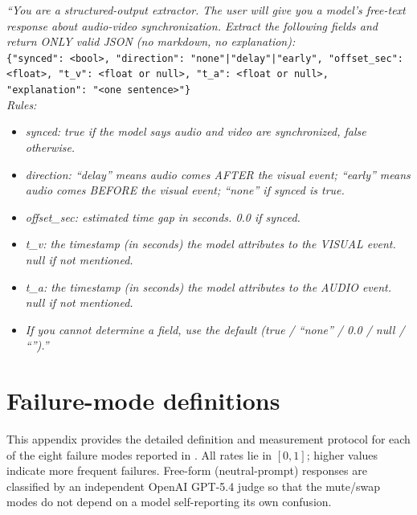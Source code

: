 \documentclass{llmxive}
\begin{document}
\begin{tcolorbox}[judgebox,title={\textsc{Shift} \textemdash{} Judge System Prompt}]
\textit{``You are a structured-output extractor. The user will give you a
model's free-text response about audio-video synchronization. Extract the
following fields and return ONLY valid JSON (no markdown, no explanation):}
\\[2pt]
\texttt{\{"synced": <bool>, "direction": "none"|"delay"|"early",
"offset\_sec": <float>, "t\_v": <float or null>, "t\_a": <float or null>,
"explanation": "<one sentence>"\}}\\[2pt]
\textit{Rules:}
\begin{itemize}\itemsep0pt
  \item \textit{synced: true if the model says audio and video are
        synchronized, false otherwise.}
  \item \textit{direction: ``delay'' means audio comes AFTER the visual
        event; ``early'' means audio comes BEFORE the visual event; ``none''
        if synced is true.}
  \item \textit{offset\_sec: estimated time gap in seconds. 0.0 if synced.}
  \item \textit{t\_v: the timestamp (in seconds) the model attributes to
        the VISUAL event. null if not mentioned.}
  \item \textit{t\_a: the timestamp (in seconds) the model attributes to
        the AUDIO event. null if not mentioned.}
  \item \textit{If you cannot determine a field, use the default (true /
        ``none'' / 0.0 / null / ``'').''}
\end{itemize}
\end{tcolorbox}



\section{Failure-mode definitions}
\label{app:failure-modes}

This appendix provides the detailed definition and measurement protocol for
each of the eight failure modes reported in
. All rates lie in $[0,1]$; higher values
indicate more frequent failures. Free-form (neutral-prompt) responses are
classified by an independent OpenAI GPT-5.4 judge so that the mute/swap modes
do not depend on a model self-reporting its own confusion.
\end{document}
